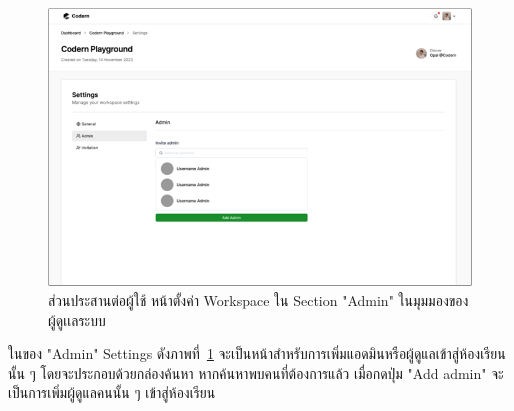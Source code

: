 \documentclass[12pt,oneside,openright,a4paper]{cpe-thai-project}
\begin{document}
    \hypertarget{ui-org-assign-settings2}{
        \begin{figure}[H]
        \centering
            \includegraphics[width=15cm]{figure/ui/ui-assign-settings2.png}
            \caption[ส่วนประสานต่อผู้ใช้ หน้าตั้งค่า Workspace ของผู้ดูเเลระบบ (2)]{ส่วนประสานต่อผู้ใช้ หน้าตั้งค่า Workspace ใน Section "Admin" ในมุมมองของผู้ดูเเลระบบ}
            \label{fig:ui-org-assign-settings2}
        \end{figure}
    }

    \pagebreak
    \begin{flushleft}
    ในของ "Admin" Settings ดังภาพที่~\ref{fig:ui-org-assign-settings2} จะเป็นหน้าสำหรับการเพิ่มแอดมินหรือผู้ดูแลเข้าสู่ห้องเรียนนั้น ๆ โดยจะประกอบด้วยกล่องค้นหา หากค้นหาพบคนที่ต้องการแล้ว เมื่อกดปุ่ม "Add admin" จะเป็นการเพิ่มผู้ดูแลคนนั้น ๆ เข้าสู่ห้องเรียน
    \end{flushleft}
    
\end{document}
